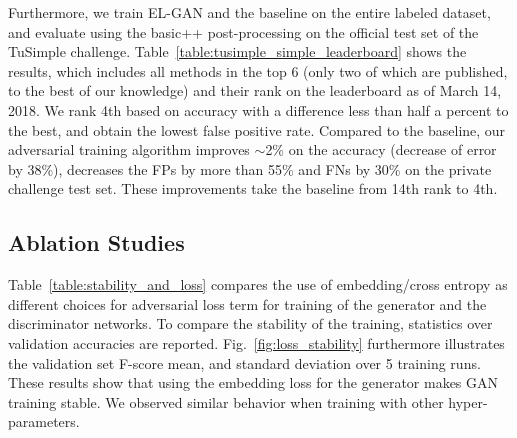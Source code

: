 \documentclass{article} \usepackage{nips13submit_e,times}
\newcommand{\elgan}{\mbox{EL-GAN}}
\begin{document}
Furthermore, we train \elgan{} and the baseline on the entire labeled dataset, and evaluate using the basic++ post-processing on the official test set of the TuSimple challenge.
Table~\ref{table:tusimple_simple_leaderboard} shows the results, which includes all methods in the top 6 (only two of which are published, to the best of our knowledge) and their rank on the leaderboard as of March 14, 2018.
We rank 4th based on accuracy with a difference less than half a percent to the best, and obtain the lowest false positive rate.
Compared to the baseline, our adversarial training algorithm improves $\sim$2\% on the accuracy (decrease of error by 38\%), decreases the FPs by more than 55\% and FNs by 30\% on the private challenge test set. 
These improvements take the baseline from 14th rank to 4th.




















\subsection{Ablation Studies}
\label{sec:ablation_studies}

Table~\ref{table:stability_and_loss} compares the use of embedding/cross entropy as different choices for adversarial loss term for training of the generator and the discriminator networks.
To compare the stability of the training, statistics over validation accuracies are reported.
Fig.~\ref{fig:loss_stability} furthermore illustrates the validation set F-score mean, and standard deviation over 5 training runs.
These results show that using the embedding loss for the generator makes GAN training stable.
We observed similar behavior when training with other hyper-parameters.
\end{document}
